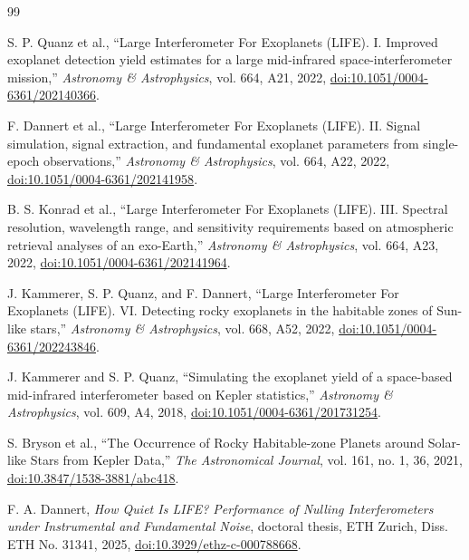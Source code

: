 \documentclass[12pt,a4paper]{article}
\numberwithin{equation}{section}
\numberwithin{figure}{section}
\numberwithin{table}{section}
\begin{document}
{\color{blue}
\begin{thebibliography}{99}

S. P. Quanz et al.,
``Large Interferometer For Exoplanets (LIFE). I. Improved exoplanet detection yield estimates for a large mid-infrared space-interferometer mission,''
\textit{Astronomy \& Astrophysics}, vol. 664, A21, 2022,
\href{https://doi.org/10.1051/0004-6361/202140366}{doi:10.1051/0004-6361/202140366}.

F. Dannert et al.,
``Large Interferometer For Exoplanets (LIFE). II. Signal simulation, signal extraction, and fundamental exoplanet parameters from single-epoch observations,''
\textit{Astronomy \& Astrophysics}, vol. 664, A22, 2022,
\href{https://doi.org/10.1051/0004-6361/202141958}{doi:10.1051/0004-6361/202141958}.

B. S. Konrad et al.,
``Large Interferometer For Exoplanets (LIFE). III. Spectral resolution, wavelength range, and sensitivity requirements based on atmospheric retrieval analyses of an exo-Earth,''
\textit{Astronomy \& Astrophysics}, vol. 664, A23, 2022,
\href{https://doi.org/10.1051/0004-6361/202141964}{doi:10.1051/0004-6361/202141964}.

J. Kammerer, S. P. Quanz, and F. Dannert,
``Large Interferometer For Exoplanets (LIFE). VI. Detecting rocky exoplanets in the habitable zones of Sun-like stars,''
\textit{Astronomy \& Astrophysics}, vol. 668, A52, 2022,
\href{https://doi.org/10.1051/0004-6361/202243846}{doi:10.1051/0004-6361/202243846}.

J. Kammerer and S. P. Quanz,
``Simulating the exoplanet yield of a space-based mid-infrared interferometer based on Kepler statistics,''
\textit{Astronomy \& Astrophysics}, vol. 609, A4, 2018,
\href{https://doi.org/10.1051/0004-6361/201731254}{doi:10.1051/0004-6361/201731254}.

S. Bryson et al.,
``The Occurrence of Rocky Habitable-zone Planets around Solar-like Stars from Kepler Data,''
\textit{The Astronomical Journal}, vol. 161, no. 1, 36, 2021,
\href{https://doi.org/10.3847/1538-3881/abc418}{doi:10.3847/1538-3881/abc418}.

F. A. Dannert,
\textit{How Quiet Is LIFE? Performance of Nulling Interferometers under Instrumental and Fundamental Noise},
doctoral thesis, ETH Zurich, Diss. ETH No. 31341, 2025,
\href{https://doi.org/10.3929/ethz-c-000788668}{doi:10.3929/ethz-c-000788668}.


\end{thebibliography}}
\end{document}
